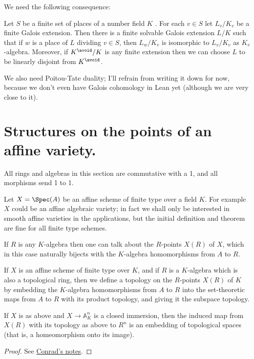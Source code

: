 We need the following consequence:

\begin{theorem}\label{Skinner_Wiles_CFT_trick}\notready Let $S$ be a finite set of places of a number field $K$ . For each $v \in S$
let $L_v/K_v$ be a finite Galois extension. Then there is a finite solvable Galois extension
$L/K$ such that if $w$ is a place of $L$ dividing $v \in S$, then $L_w/K_v$ is isomorphic to $L_v/K_v$ as $K_v$-algebra. Moreover, if $K^{\avoid} /K$ is
any finite extension then we can choose $L$ to be linearly disjoint from $K^{\avoid}$.
\end{theorem}

We also need Poitou-Tate duality; I'll refrain from writing it down for now, because we don't even have Galois cohomology in Lean yet (although we are very close to it).

\section{Structures on the points of an affine variety.}

All rings and algebras in this section are commutative with a 1, and all morphisms send 1 to 1.

Let $X=\Spec(A)$ be an affine scheme of finite type over a field $K$. For example $X$ could be an affine algebraic variety; in fact we shall only be interested in smooth affine varieties in the applications, but the initial definition and theorem are fine for all finite type schemes.

If $R$ is any $K$-algebra then one can talk about the $R$-points $X(R)$ of $X$, which in this case
naturally bijects with the $K$-algebra homomorphisms from $A$ to $R$.

\begin{definition}\label{topology_on_affine_variety_points} If $X$ is an affine scheme of finite
    type over $K$, and if $R$ is a $K$-algebra which is also a topological ring, then we define a topology on the $R$-points $X(R)$ of $K$ by embedding the $K$-algebra homomorphisms from $A$ to $R$ into the set-theoretic maps from $A$ to $R$ with its product topology, and giving it the subspace topology.
\end{definition}

\begin{theorem}\label{topology_on_affine_variety_computation}
    If $X$ is as above and $X\to\mathbb{A}^n_K$ is a closed immersion, then the induced map from $X(R)$ with its topology as above to $R^n$ is an embedding of topological spaces (that is, a homeomorphism onto its image).
\end{theorem}
\begin{proof} See \href{https://math.stanford.edu/~conrad/papers/adelictop.pdf}{Conrad's notes}.
\end{proof}

